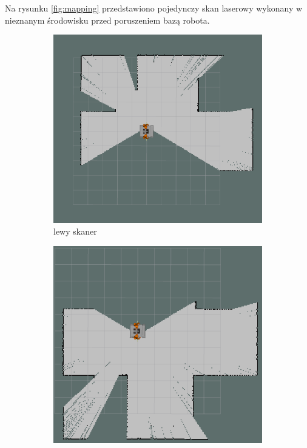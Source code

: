 		Na rysunku \ref{fig:mapping} przedstawiono pojedynczy skan laserowy wykonany w nieznanym środowisku przed poruszeniem bazą robota. 

		\begin{figure}[h!]
 			 \centering
  			\begin{subfigure}[b]{0.4\linewidth}
   				 \includegraphics[width=\linewidth]{imgs/wstepne_badania/scan_l.png}
    				\caption{lewy skaner}
  			\end{subfigure}
  			\begin{subfigure}[b]{0.4\linewidth}
    				\includegraphics[width=\linewidth]{imgs/wstepne_badania/scan_r.png}

\end{subfigure}
\end{figure}
